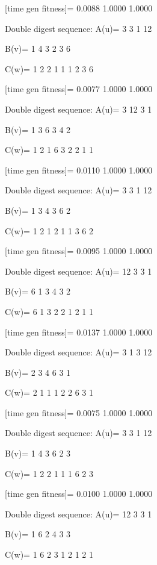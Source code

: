 [time gen fitness]=
    0.0088    1.0000    1.0000

Double digest sequence:
A(u)=
     3     3     1    12

B(v)=
     1     4     3     2     3     6

C(w)=
     1     2     2     1     1     1     2     3     6

[time gen fitness]=
    0.0077    1.0000    1.0000

Double digest sequence:
A(u)=
     3    12     3     1

B(v)=
     1     3     6     3     4     2

C(w)=
     1     2     1     6     3     2     2     1     1

[time gen fitness]=
    0.0110    1.0000    1.0000

Double digest sequence:
A(u)=
     3     3     1    12

B(v)=
     1     3     4     3     6     2

C(w)=
     1     2     1     2     1     1     3     6     2

[time gen fitness]=
    0.0095    1.0000    1.0000

Double digest sequence:
A(u)=
    12     3     3     1

B(v)=
     6     1     3     4     3     2

C(w)=
     6     1     3     2     2     1     2     1     1

[time gen fitness]=
    0.0137    1.0000    1.0000

Double digest sequence:
A(u)=
     3     1     3    12

B(v)=
     2     3     4     6     3     1

C(w)=
     2     1     1     1     2     2     6     3     1

[time gen fitness]=
    0.0075    1.0000    1.0000

Double digest sequence:
A(u)=
     3     3     1    12

B(v)=
     1     4     3     6     2     3

C(w)=
     1     2     2     1     1     1     6     2     3

[time gen fitness]=
    0.0100    1.0000    1.0000

Double digest sequence:
A(u)=
    12     3     3     1

B(v)=
     1     6     2     4     3     3

C(w)=
     1     6     2     3     1     2     1     2     1

